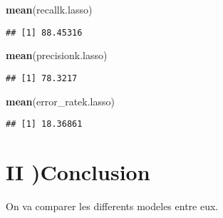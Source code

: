 \documentclass[
]{article}
\newenvironment{Shaded}{\begin{snugshade}}{\end{snugshade}}
\newcommand{\KeywordTok}[1]{\textcolor[rgb]{0.13,0.29,0.53}{\textbf{#1}}}
\newcommand{\NormalTok}[1]{#1}
\begin{document}
\begin{Shaded}
\begin{Highlighting}[]
\KeywordTok{mean}\NormalTok{(recallk.lasso)}
\end{Highlighting}
\end{Shaded}

\begin{verbatim}
## [1] 88.45316
\end{verbatim}

\begin{Shaded}
\begin{Highlighting}[]
\KeywordTok{mean}\NormalTok{(precisionk.lasso)}
\end{Highlighting}
\end{Shaded}

\begin{verbatim}
## [1] 78.3217
\end{verbatim}

\begin{Shaded}
\begin{Highlighting}[]
\KeywordTok{mean}\NormalTok{(error_ratek.lasso)}
\end{Highlighting}
\end{Shaded}

\begin{verbatim}
## [1] 18.36861
\end{verbatim}

\hypertarget{ii-conclusion}{%
\section{II )Conclusion}\label{ii-conclusion}}

On va comparer les differents modeles entre eux.
\end{document}
